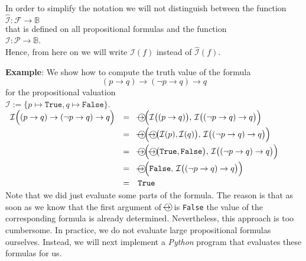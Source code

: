 In order to simplify the notation we will not distinguish between the function
\\[0.2cm]
\hspace*{1.3cm}
$\widehat{\mathcal{I}}: \mathcal{F} \rightarrow \mathbb{B}$
\\[0.2cm]
that is defined on all propositional formulas and the function
\\[0.2cm]
\hspace*{1.3cm}
$\mathcal{I}: \mathcal{P} \rightarrow \mathbb{B}$.
\\[0.2cm]
Hence, from here on we will write $\mathcal{I}(f)$ instead of $\widehat{\mathcal{I}}(f)$.

\noindent
\textbf{Example}: We show how to compute the truth value of the formula
$$  (p \rightarrow q) \rightarrow (\neg p \rightarrow q) \rightarrow q $$
for the propositional valuation
\\[0.2cm]
\hspace*{1.3cm}
$\mathcal{I} := \{ p \mapsto \mathtt{True}, q \mapsto \mathtt{False} \}$.
\\[0.2cm]
\hspace*{1.3cm}
$
  \begin{array}[b]{lcl}
   \mathcal{I}\Bigl( (p \rightarrow q) \rightarrow (\neg p \rightarrow q) \rightarrow q  \Bigr) 
   & = &  \circright\Bigl( \mathcal{I}\bigl( (p \rightarrow q) \bigr),\, \mathcal{I}\bigl((\neg p \rightarrow q) \rightarrow q\bigr) \Bigr) \\[0.2cm]
   & = & \circright\Bigl( \circright\bigl( \mathcal{I}(p), \mathcal{I}(q) \bigr),\, \mathcal{I}\bigl((\neg p \rightarrow q) \rightarrow q\bigr) \Bigr) \\[0.2cm]
   & = & \circright\Bigl( \circright\bigl( \texttt{True}, \texttt{False} \bigr),\, \mathcal{I}\bigl((\neg p \rightarrow q) \rightarrow q\bigr) \Bigr) \\[0.2cm]
   & = & \circright\Bigl( \texttt{False}, \, \mathcal{I}\bigl((\neg p \rightarrow q) \rightarrow q\bigr) \Bigr) \\[0.2cm]
   & = & \texttt{True} 
  \end{array}
$ \eox
\\[0.2cm]
Note that we did just evaluate some parts of the formula.  The reason is that as soon as we know that the first
argument of $\circright$ is \texttt{False} the value of the corresponding formula is already determined.
Nevertheless, this approach is too cumbersome.  In practice, we do not evaluate large propositional formulas
ourselves.  Instead, we will next implement a \textsl{Python} program that evaluates these formulas for us.

